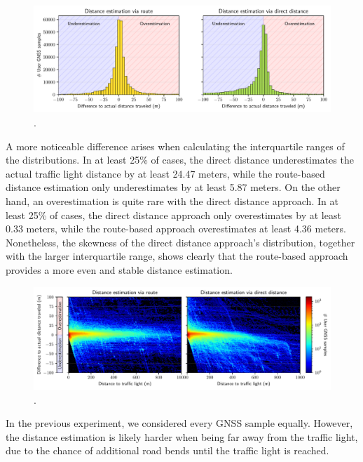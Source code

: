 \begin{figure}[t]
\centering 
\includegraphics[width=\linewidth]{images/routing-distance-distribution.pdf}
\caption{.}
\label{fig:routing-distance-distribution}
\end{figure}

A more noticeable difference arises when calculating the interquartile ranges of the distributions. In at least 25\% of cases, the direct distance underestimates the actual traffic light distance by at least 24.47 meters, while the route-based distance estimation only underestimates by at least 5.87 meters. On the other hand, an overestimation is quite rare with the direct distance approach. In at least 25\% of cases, the direct distance approach only overestimates by at least 0.33 meters, while the route-based approach overestimates at least 4.36 meters. Nonetheless, the skewness of the direct distance approach's distribution, together with the larger interquartile range, shows clearly that the route-based approach provides a more even and stable distance estimation.

\begin{figure}[t]
\centering 
\includegraphics[width=\linewidth]{images/routing-distance-scatter.pdf}
\caption{.}
\label{fig:routing-distance-scatter}
\end{figure}

In the previous experiment, we considered every GNSS sample equally. However, the distance estimation is likely harder when being far away from the traffic light, due to the chance of additional road bends until the traffic light is reached. 

